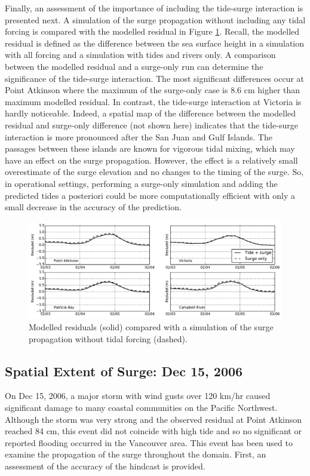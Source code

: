 \documentclass[pdftex,10pt]{article}
\begin{document}
Finally, an assessment of the importance of including the tide-surge interaction is presented next. A simulation of the surge propagation without including any tidal forcing is compared with the modelled residual in Figure \ref{fig:tidesurge}.  Recall, the modelled residual is defined as the difference between the sea surface height in a simulation with all forcing and a simulation with tides and rivers only. A comparison between the modelled residual and a surge-only run can determine the significance of the tide-surge interaction. The most significant differences occur at Point Atkinson where the maximum of the surge-only case is 8.6 cm higher than maximum modelled residual.  In contrast, the tide-surge interaction at Victoria is hardly noticeable. Indeed, a spatial map of the difference between the modelled residual and surge-only difference (not shown here) indicates that the tide-surge interaction is more pronounced after the San Juan and Gulf Islands. The passages between these islands are known for vigorous tidal mixing, which may have an effect on the surge propagation. However, the effect is a relatively small overestimate of the surge elevation and no changes to the timing of the surge. So, in operational settings, performing a surge-only simulation and adding the predicted tides a posteriori could be more computationally efficient with only a small decrease in the accuracy of the prediction. 

\begin{figure}
\centering
\includegraphics[scale=0.6]{Figures/feb2006_tidesurge.pdf}
\caption{Modelled residuals (solid) compared with a simulation of the surge propagation without tidal forcing (dashed). }
\label{fig:tidesurge}
\end{figure}

\subsection{Spatial Extent of Surge: Dec 15, 2006}
On Dec 15, 2006, a major storm with wind gusts over 120 km/hr caused significant damage to many coastal communities on the Pacific Northwest. Although the storm was very strong and the observed residual at Point Atkinson reached 84 cm, this event did not coincide with high tide and so no significant or reported flooding occurred in the Vancouver area\citep{forseth2006adaptation}. This event has been used to examine the propagation of the surge throughout the domain. First, an assessment of the accuracy of the hindcast is provided. 
\end{document}
